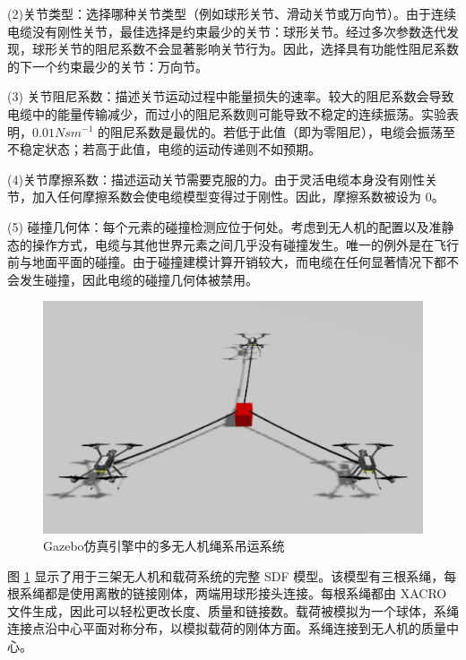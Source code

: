 \documentclass[lang=chs, degree=master, blindreview=false, winfonts=true]{yanputhesis}
\begin{document}
(2){关节类型}：选择哪种关节类型（例如球形关节、滑动关节或万向节）。由于连续电缆没有刚性关节，最佳选择是约束最少的关节：球形关节。经过多次参数迭代发现，球形关节的阻尼系数不会显著影响关节行为。因此，选择具有功能性阻尼系数的下一个约束最少的关节：万向节。
    
(3) {关节阻尼系数}：描述关节运动过程中能量损失的速率。较大的阻尼系数会导致电缆中的能量传输减少，而过小的阻尼系数则可能导致不稳定的连续振荡。实验表明，$0.01 N s m^{-1}$
的阻尼系数是最优的。若低于此值（即为零阻尼），电缆会振荡至不稳定状态；若高于此值，电缆的运动传递则不如预期。
    
(4){关节摩擦系数}：描述运动关节需要克服的力。由于灵活电缆本身没有刚性关节，加入任何摩擦系数会使电缆模型变得过于刚性。因此，摩擦系数被设为 0。
    
(5) {碰撞几何体}：每个元素的碰撞检测应位于何处。考虑到无人机的配置以及准静态的操作方式，电缆与其他世界元素之间几乎没有碰撞发生。唯一的例外是在飞行前与地面平面的碰撞。由于碰撞建模计算开销较大，而电缆在任何显著情况下都不会发生碰撞，因此电缆的碰撞几何体被禁用。



\begin{figure}[hbt!]
	\centering
	\includegraphics[width=36pc]{picture/5_2.png} 
	\caption{Gazebo仿真引擎中的多无人机绳系吊运系统} 
	\label{5_2}
\end{figure}

图 \ref{5_2} 显示了用于三架无人机和载荷系统的完整 SDF 模型。该模型有三根系绳，每根系绳都是使用离散的链接刚体，两端用球形接头连接。每根系绳都由 XACRO 文件生成，因此可以轻松更改长度、质量和链接数。载荷被模拟为一个球体，系绳连接点沿中心平面对称分布，以模拟载荷的刚体方面。系绳连接到无人机的质量中心。
\end{document}
